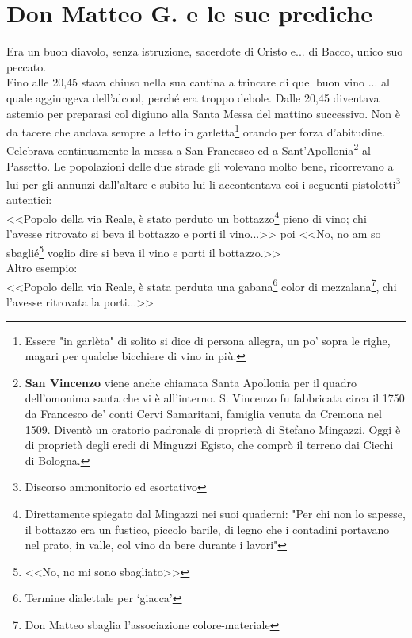
\chapter{Don Matteo G. e le sue prediche}
Era un buon diavolo, senza istruzione, sacerdote di Cristo e... di Bacco, unico suo peccato.\\
\indent Fino alle 20,45 stava chiuso nella sua cantina a trincare di quel buon vino ... al quale aggiungeva dell'alcool, perché era troppo debole. Dalle 20,45 diventava astemio per preparasi col digiuno alla Santa Messa del mattino successivo. Non è da tacere che andava sempre a letto in garletta\footnote{Essere "in garlèta" di solito si dice di persona allegra, un po' sopra le righe, magari per qualche bicchiere di vino in più.} orando per forza d'abitudine. Celebrava continuamente la messa a San Francesco ed a Sant'Apollonia\footnote{\textbf{San Vincenzo} viene anche chiamata Santa Apollonia per il quadro dell'omonima santa che vi è all'interno. S. Vincenzo fu fabbricata circa il 1750 da Francesco de' conti Cervi Samaritani, famiglia venuta da Cremona nel 1509. Diventò un oratorio padronale di proprietà di Stefano Mingazzi. Oggi è di proprietà degli eredi di Minguzzi Egisto, che comprò il terreno dai Ciechi di Bologna.} al Passetto. Le popolazioni delle due strade gli volevano molto bene, ricorrevano a lui per gli annunzi dall'altare e subito lui li accontentava coi i seguenti pistolotti\footnote{Discorso ammonitorio ed esortativo} autentici:\\
\indent <<Popolo della via Reale, è stato perduto un bottazzo\footnote{Direttamente spiegato dal Mingazzi nei suoi quaderni: "Per chi non lo sapesse, il bottazzo era un fustico, piccolo barile, di legno che i contadini portavano nel prato, in valle, col vino da bere durante i lavori"} pieno di vino; chi l'avesse ritrovato si beva il bottazzo e porti il vino...>> poi <<No, no am so sbaglié\footnote{<<No, no mi sono sbagliato>>} voglio dire si beva il vino e porti il bottazzo.>>\\
\indent Altro esempio:\\
\indent<<Popolo della via Reale, è stata perduta una gabana\footnote{Termine dialettale per `giacca'} color di mezzalana\footnote{Don Matteo sbaglia l'associazione colore-materiale}, chi l'avesse ritrovata la porti...>>

